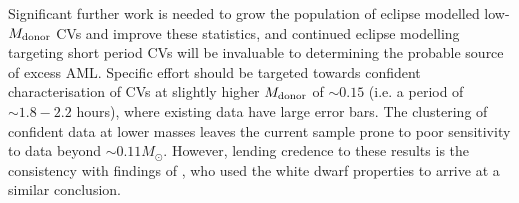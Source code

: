 Significant further work is needed to grow the population of eclipse modelled low-$M_{\rm donor}$ CVs and improve these statistics, and continued eclipse modelling targeting short period CVs will be invaluable to determining the probable source of excess AML.
Specific effort should be targeted towards confident characterisation of CVs at slightly higher $M_{\rm donor}$ of $\sim0.15$ (i.e. a period of $\sim 1.8 - 2.2$ hours), where existing data have large error bars. The clustering of confident data at lower masses leaves the current sample prone to poor sensitivity to data beyond $\sim 0.11 M_\odot$.
However, lending credence to these results is the consistency with findings of \citet{Pala2021}, who used the white dwarf properties to arrive at a similar conclusion.

